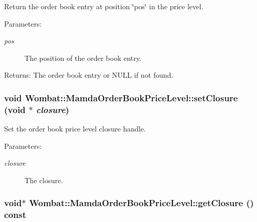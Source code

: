 Return the order book entry at position \char`\"{}pos\char`\"{} in the price level. 

\begin{Desc}
\item[Parameters:]
\begin{description}
\item[{\em pos}]The position of the order book entry. \end{description}
\end{Desc}
\begin{Desc}
\item[Returns:]The order book entry or NULL if not found. \end{Desc}
\hypertarget{classWombat_1_1MamdaOrderBookPriceLevel_50ba53496b7d105de413bafeaf4ec1b1}{
\subsubsection[setClosure]{\setlength{\rightskip}{0pt plus 5cm}void Wombat::Mamda\-Order\-Book\-Price\-Level::set\-Closure (void $\ast$ {\em closure})}}
\label{classWombat_1_1MamdaOrderBookPriceLevel_50ba53496b7d105de413bafeaf4ec1b1}


Set the order book price level closure handle. 

\begin{Desc}
\item[Parameters:]
\begin{description}
\item[{\em closure}]The closure. \end{description}
\end{Desc}
\hypertarget{classWombat_1_1MamdaOrderBookPriceLevel_66f596682605b9c643eb8e3a68043621}{
\subsubsection[getClosure]{\setlength{\rightskip}{0pt plus 5cm}void$\ast$ Wombat::Mamda\-Order\-Book\-Price\-Level::get\-Closure () const}}
\label{classWombat_1_1MamdaOrderBookPriceLevel_66f596682605b9c643eb8e3a68043621}


